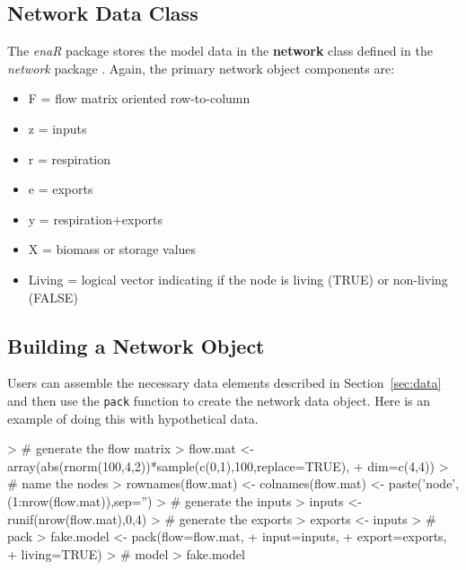 \documentclass[article]{jss}
\begin{document}

\subsection{Network Data Class}

The \textit{enaR} package stores the model data in the \textbf{network}
class defined in the \textit{network} package \citep[see][for
details]{butts08_network}. Again, the primary network object
components are:

\begin{itemize}
\item F = flow matrix oriented row-to-column
\item z = inputs
\item r = respiration
\item e = exports
\item y = respiration+exports
\item X = biomass or storage values
\item Living = logical vector indicating if the node is living
  (TRUE) or non-living (FALSE)
\end{itemize}

\subsection{Building a Network Object}
Users can assemble the necessary data elements described in
Section~\ref{sec:data} and then use the \texttt{pack} function to create the
network data object.  Here is an example of doing this with
hypothetical data.

\begin{Schunk}
\begin{Sinput}
> # generate the flow matrix
> flow.mat <- array(abs(rnorm(100,4,2))*sample(c(0,1),100,replace=TRUE),
+                   dim=c(4,4))
> # name the nodes
> rownames(flow.mat) <- colnames(flow.mat) <- paste('node',(1:nrow(flow.mat)),sep='')
> # generate the inputs
> inputs <- runif(nrow(flow.mat),0,4)
> # generate the exports
> exports <- inputs
> # pack
> fake.model <- pack(flow=flow.mat,
+                    input=inputs,
+                    export=exports,
+                    living=TRUE)
> # model
> fake.model
\end{Sinput}
\end{Schunk}
\end{document}
